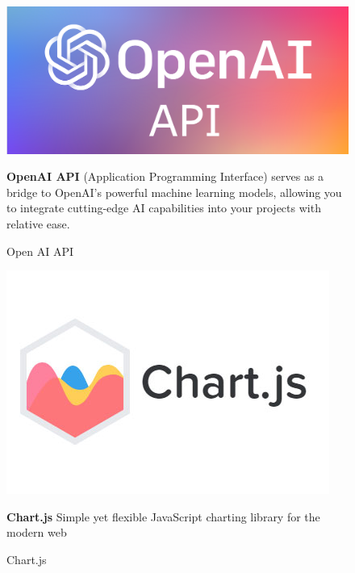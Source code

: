 \begin{figure}[h]
\centering
\begin{minipage}{0.3\textwidth}
    \centering
    \includegraphics[width=\linewidth,frame]{figures/openaiapi.png}
    \caption{Open AI API}
\end{minipage}
\hfill
\begin{minipage}{0.6\textwidth}
\textbf{OpenAI API} (Application Programming Interface) serves as a bridge to OpenAI's powerful machine learning models, allowing you to integrate cutting-edge AI capabilities into your projects with relative ease.\cite{samplewebs24}
\end{minipage}
\end{figure}

\begin{figure}[h]
\centering
\begin{minipage}{0.3\textwidth}
    \centering
    \includegraphics[width=\linewidth,frame]{figures/chartjs.jpg}
    \caption{Chart.js}
\end{minipage}
\hfill
\begin{minipage}{0.6\textwidth}
\textbf{Chart.js} Simple yet flexible JavaScript charting library for the modern web\cite{samplewebs25}
\end{minipage}
\end{figure}

